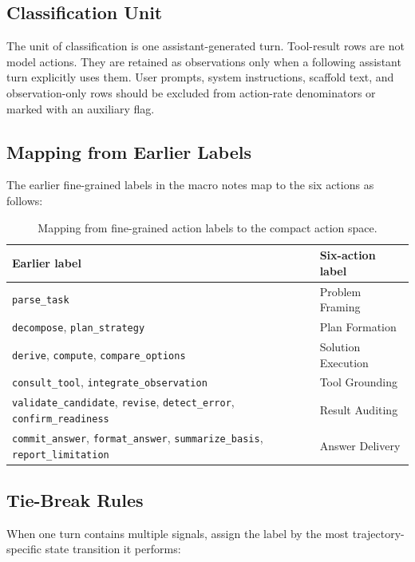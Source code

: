 \subsection{Classification Unit}

The unit of classification is one assistant-generated turn. Tool-result rows are
not model actions. They are retained as observations only when a following
assistant turn explicitly uses them. User prompts, system instructions, scaffold
text, and observation-only rows should be excluded from action-rate denominators
or marked with an auxiliary flag.

\subsection{Mapping from Earlier Labels}

The earlier fine-grained labels in the macro notes map to the six actions as
follows:

\begin{table}[h]
\centering
\small
\begin{tabular}{ll}
\toprule
Earlier label & Six-action label \\
\midrule
\texttt{parse\_task} & Problem Framing \\
\texttt{decompose}, \texttt{plan\_strategy} & Plan Formation \\
\texttt{derive}, \texttt{compute}, \texttt{compare\_options} & Solution Execution \\
\texttt{consult\_tool}, \texttt{integrate\_observation} & Tool Grounding \\
\texttt{validate\_candidate}, \texttt{revise}, \texttt{detect\_error},
\texttt{confirm\_readiness} & Result Auditing \\
\texttt{commit\_answer}, \texttt{format\_answer}, \texttt{summarize\_basis},
\texttt{report\_limitation} & Answer Delivery \\
\bottomrule
\end{tabular}
\caption{Mapping from fine-grained action labels to the compact action space.}
\label{tab:fine-to-six-action-map}
\end{table}

\subsection{Tie-Break Rules}

When one turn contains multiple signals, assign the label by the most
trajectory-specific state transition it performs:

